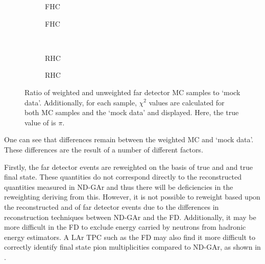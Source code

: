 \begin{figure}[h]
	\begin{subfigure}[t]{.5\linewidth}
		\begin{adjustbox}{max totalsize=\linewidth, center}
			
		\end{adjustbox}
		\caption{FHC \numu}
	\end{subfigure}
	\hfill
	\begin{subfigure}[t]{.5\linewidth}
		\begin{adjustbox}{max totalsize=\linewidth, center}
			
		\end{adjustbox}
		\caption{FHC \nue}
	\end{subfigure} \\
	\begin{subfigure}[t]{.5\linewidth}
		\begin{adjustbox}{max totalsize=\linewidth, center}
			
		\end{adjustbox}
		\caption{RHC \anumu}
	\end{subfigure}
	\hfill
	\begin{subfigure}[t]{.5\linewidth}
		\begin{adjustbox}{max totalsize=\linewidth, center}
			
		\end{adjustbox}
		\caption{RHC \anue}
	\end{subfigure}
	\caption[Ratio of weighted and unweighted far detector MC samples to mock data.]{Ratio of weighted and unweighted far detector MC samples to `mock data'. Additionally, for each sample, $\chi^{2}$ values are calculated for both MC samples and the `mock data' and displayed. Here, the true value of \dcp is $\pi$.}
	\label{fig:reweightedSamplesRatio}
\end{figure} 

One can see that differences remain between the weighted MC and `mock data'. 
These differences are the result of a number of different factors.

Firstly, the far detector events are reweighted on the basis of true \evis and \pvis and true final state.
These quantities do not correspond directly to the reconstructed quantities measured in ND-GAr and thus there will be deficiencies in the reweighting deriving from this.
However, it is not possible to reweight based upon the reconstructed \evis and \pvis of far detector events due to the differences in reconstruction techniques between ND-GAr and the FD.
Additionally, it may be more difficult in the FD to exclude energy carried by neutrons from hadronic energy estimators.
A LAr TPC such as the FD may also find it more difficult to correctly identify final state pion multiplicities compared to ND-GAr, as shown in .

